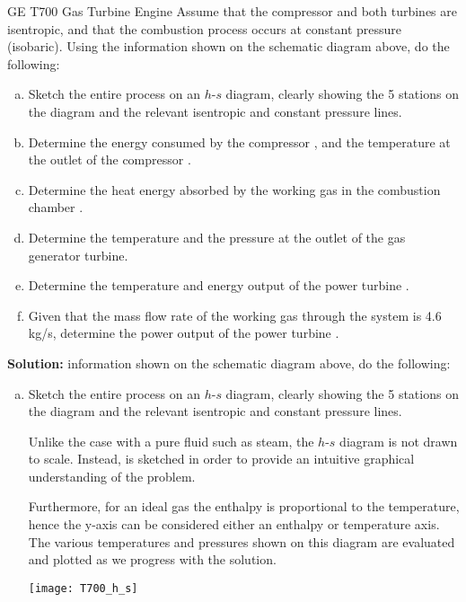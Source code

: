 \begin{example}[label=ex:T700]{GE T700 Gas Turbine Engine}
  Assume that the compressor and both turbines are isentropic, and that the combustion process occurs at constant pressure (isobaric). Using the information shown on the schematic diagram above, do the following:
  \begin{enumerate}[a)]
  \item  Sketch the entire process on an $h$-$s$ diagram, clearly showing the 5 stations on the diagram and the relevant isentropic and constant pressure lines.
  \item Determine the energy consumed by the compressor \answer{[$w_C$ = -328 kJ/kg]}, and the temperature at the outlet of the compressor \answer{[$T_2$ = 587 K]}.
  \item Determine the heat energy absorbed by the working gas in the combustion chamber \answer{[$q_H$ = 754 kJ/kg]}.
  \item Determine the temperature \answer{[$T_4$ = 975 K]} and the pressure \answer{[$p_4$ = 546 kPa]} at the outlet of the gas generator turbine.
  \item Determine the temperature \answer{[$T_5$ = 627 K]} and energy output of the power turbine \answer{[$w_{PT}$ = 382.5 kJ/kg]}.
  \item Given that the mass flow rate of the working gas through the system is 4.6 kg/s, determine the power output of the power turbine \answer{[1.76 MW]}.
  \end{enumerate}

  {\bf Solution:}
  information shown on the schematic diagram above, do the following:
  \begin{enumerate}[a)]
  \item  Sketch the entire process on an $h$-$s$ diagram, clearly showing the 5 stations on the diagram and the relevant isentropic and constant pressure lines.

    Unlike the case with a pure fluid such as steam, the $h$-$s$ diagram is not drawn to scale. Instead, is sketched in order to provide an intuitive graphical understanding of the problem.

    Furthermore, for an ideal gas the enthalpy is proportional to the temperature, hence the y-axis can be considered either an enthalpy or temperature axis. The various temperatures and pressures shown on this diagram are evaluated and plotted as we progress with the solution.

  \begin{center}
    \texttt{[image: T700\_h\_s]}
  \end{center}
      

\end{enumerate}
\end{example}

